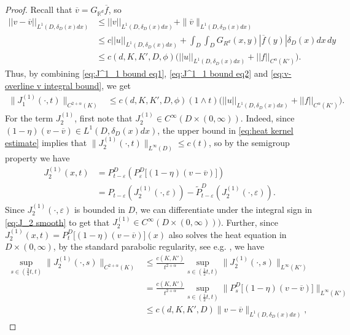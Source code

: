 \documentclass[12pt,a4paper,onecolumn]{amsart}
\theoremstyle{definition}
\newcommand{\R}{\mathbb{R}}
\newcommand{\1}{\mathbf 1}
\newcommand{\LLL}{L^1(D,\de(x)dx)}
\newcommand{\de}{\delta_D}
\newcommand{\wt}{\widetilde}
\numberwithin{equation}{section}
\begin{document}
\begin{proof}
    Recall that $\overline v=G_{\R^d}\overline f$, so
	\begin{align}
		||v-\overline v||_{\LLL}&\le ||v||_{\LLL}+\|\overline v\|_{\LLL}\nonumber\\
         &\le c||u||_{\LLL}+\int_D\int_D G_{R^d}(x,y)|\overline f(y)|\de(x)dx\,dy\nonumber\\
         &\le c(d,K,K',D,\phi) \big(||u||_{\LLL}+||f||_{C^{\alpha}(K')}\big).\label{eq:v-overline v integral bound}
    \end{align}
    Thus, by combining \eqref{eq:J^1_1 bound eq1},  \eqref{eq:J^1_1 bound eq2} and \eqref{eq:v-overline v integral bound}, we get
    \begin{align*}
        \|J^{(1)}_1(\cdot,t)\|_{C^{2+\alpha}(K)}&\le c(d,K,K',D,\phi)(1\wedge t)\big(||u||_{\LLL}+||f||_{C^{\alpha}(K')}\big).
    \end{align*}
    For the term $J^{(1)}_2$, first note that $J^{(1)}_2\in C^\infty(D\times(0,\infty))$. Indeed, since $(1-\eta)(v-\overline v)\in \LLL$, the upper bound in \eqref{eq:heat kernel estimate} implies that $\|J^{(1)}_2(\cdot,t)\|_{L^\infty(D)}\le c(t)$, so by the semigroup property we have
    \begin{align}
    J^{(1)}_2(x,t)&=P_{t-\varepsilon}^D\left(P_\varepsilon^D\big[(1-\eta)(v-\overline v)\big]\right)\nonumber\\
    &=P_{t-\varepsilon}(J^{(1)}_2(\cdot,\varepsilon))-\wt{P}_{t-\varepsilon}^D(J^{(1)}_2(\cdot,\varepsilon)).\label{eq:J_2 smooth}
    \end{align}
    Since $J^{(1)}_2(\cdot,\varepsilon)$ is bounded in $D$, we can differentiate under the integral sign in \eqref{eq:J_2 smooth} to get that $J^{(1)}_2\in C^\infty(D\times(0,\infty)))$.
    Further, since $J^{(1)}_2(x,t)=P_t^D\big[(1-\eta)(v-\overline v)\big](x)$ also solves the heat equation in $D\times (0,\infty)$, by the standard parabolic regularity, see e.g. \cite[Theorem 9 in Section 2.3]{evans_pde}, we have
    \begin{align}
        \sup_{s\in (\frac34 t,t)}\|J^{(1)}_2(\cdot,s)\|_{C^{2+\alpha}(K)}&\le \frac{c(K,K')}{t^{2+\alpha}}\sup_{s\in (\frac12 t,t)}\|J^{(1)}_2(\cdot,s)\|_{L^\infty(K')}\nonumber\\
        &=\frac{c(K,K')}{t^{2+\alpha}}\sup_{s\in (\frac12 t,t)}\|P_s^D\big[(1-\eta)(v-\overline v)]\|_{L^\infty(K')}\label{eq:parabolic eq dimin.1}\\
        &\le c(d,K,K',D)\|v-\overline v\|_{\LLL},\label{eq:parabolic eq dimin.2}
    \end{align}

\end{proof}
\end{document}
